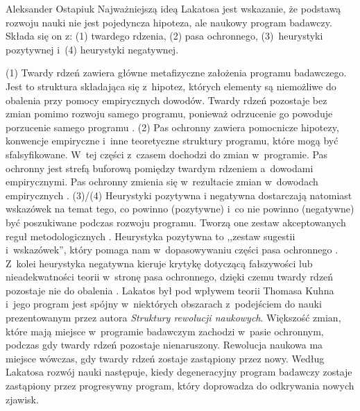 \begin{artplenv}{Aleksander Ostapiuk}
Najważniejszą ideą Lakatosa jest wskazanie, że podstawą rozwoju nauki nie jest pojedyncza hipoteza, ale naukowy program
badawczy. Składa się on z: (1) twardego rdzenia, (2) pasa ochronnego, (3)~heurystyki pozytywnej  i~(4) heurystyki negatywnej. 

(1) Twardy rdzeń zawiera główne metafizyczne założenia programu badawczego. Jest to struktura składająca
się z~hipotez, których elementy są niemożliwe do obalenia przy pomocy empirycznych dowodów. Twardy rdzeń pozostaje bez zmian
pomimo rozwoju samego programu, ponieważ odrzucenie go powoduje porzucenie samego programu
\parencite[s.~122]{hands_reflection_2001}.
(2) Pas ochronny zawiera pomocnicze hipotezy, konwencje
empiryczne i~inne teoretyczne struktury programu, które mogą być sfalsyfikowane. W~tej części z~czasem dochodzi do
zmian w~programie. Pas ochronny jest strefą buforową pomiędzy twardym rdzeniem a~dowodami empirycznymi. Pas ochronny zmienia
się w~rezultacie zmian w~dowodach empirycznych
\parencite[s.~122]{hands_reflection_2001}.
(3)/(4)
Heurystyki pozytywna i negatywna dostarczają natomiast wskazówek na temat tego, co powinno (pozytywne) i~co nie powinno (negatywne)
być poszukiwane podczas rozwoju programu. Tworzą one zestaw akceptowanych reguł metodologicznych
\parencite[s.~47]{lakatos_falsification_1970}.
Heurystyka pozytywna to ,,zestaw sugestii i~wskazówek'', który pomaga
nam w~dopasowywaniu części pasa ochronnego
\parencite[s.~50]{lakatos_falsification_1970}.
Z~kolei heurystyka negatywna
kieruje krytykę dotyczącą fałszywości lub nieadekwatności teorii w~stronę pasa ochronnego, dzięki czemu
twardy rdzeń pozostaje nie do obalenia
\parencite[s.~48–50]{lakatos_falsification_1970}.
Lakatos był pod wpływem
teorii Thomasa Kuhna
\parencite*{kuhn_structure_1962}
i~jego program jest spójny w~niektórych obszarach z~podejściem do nauki
prezentowanym przez autora \textit{Struktury rewolucji naukowych}. Większość zmian, które mają miejsce w~programie
badawczym zachodzi w~pasie ochronnym, podczas gdy twardy rdzeń pozostaje nienaruszony. Rewolucja naukowa ma miejsce
wówczas, gdy twardy rdzeń zostaje zastąpiony przez nowy. Według Lakatosa rozwój nauki następuje, kiedy degeneracyjny program
badawczy zostaje zastąpiony przez progresywny program, który doprowadza do odkrywania nowych zjawisk.


\end{artplenv}
